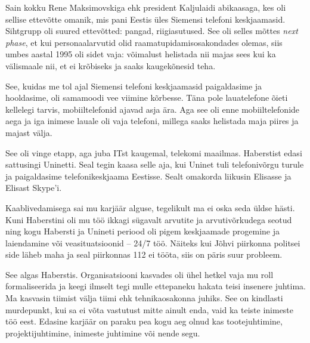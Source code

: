 Sain kokku Rene 
Maksimovskiga ehk president Kaljulaidi 
abikaasaga, kes oli sellise ettevõtte omanik, mis pani Eestis üles Siemensi 
telefoni keskjaamasid. Sihtgrupp oli suured ettevõtted: pangad, 
riigiasutused. See oli selles mõttes \emph{next phase}, et kui 
personaalarvutid olid raamatupidamisosakondades olemas, siis umbes aastal 1995 
oli sidet vaja: võimalust helistada nii 
majas sees kui ka välismaale nii, et ei krõbiseks ja saaks kaugekõnesid teha. 

See, kuidas me tol ajal Siemensi telefoni keskjaamasid paigaldasime ja hooldasime, 
oli samamoodi vee viimine kõrbesse. Täna pole lauatelefone 
õieti kellelegi tarvis, mobiiltelefonid ajavad asja ära. Aga see oli enne 
mobiiltelefonide aega ja iga inimese lauale oli vaja 
telefoni, millega saaks helistada maja piires ja majast välja. 


See oli vinge etapp, aga juba ITst kaugemal, telekomi maailmas. Haberstist 
edasi sattusingi Uninetti. Seal tegin kaasa selle aja, 
kui Uninet tuli telefonivõrgu turule ja paigaldasime telefonikeskjaama 
Eestisse. Sealt omakorda liikusin Elisasse ja Elisast Skype'i. 


Kaablivedamisega sai mu karjäär alguse, 
tegelikult ma ei oska seda üldse hästi. Kuni Haberstini oli mu töö
ikkagi sügavalt arvutite ja arvutivõrkudega seotud ning kogu Habersti ja 
Unineti periood oli pigem keskjaamade progemine ja laiendamine või 
veasituatsioonid -- 24/7 töö. Näiteks kui Jõhvi piirkonna politsei side läheb maha ja seal piirkonnas 112 ei tööta, siis on päris suur 
probleem. 


See algas Haberstis. Organisatsiooni kasvades oli ühel hetkel vaja 
mu roll formaliseerida ja keegi ilmselt tegi mulle ettepaneku hakata teisi insenere juhtima. Ma 
kasvasin tiimist välja tiimi ehk tehnikaosakonna juhiks. See on kindlasti murdepunkt, kui sa ei
võta vastutust mitte ainult enda, vaid ka teiste 
inimeste töö eest. Edasine karjäär on paraku pea kogu aeg 
olnud kas tootejuhtimine, projektijuhtimine, inimeste juhtimine või 
nende segu. 

